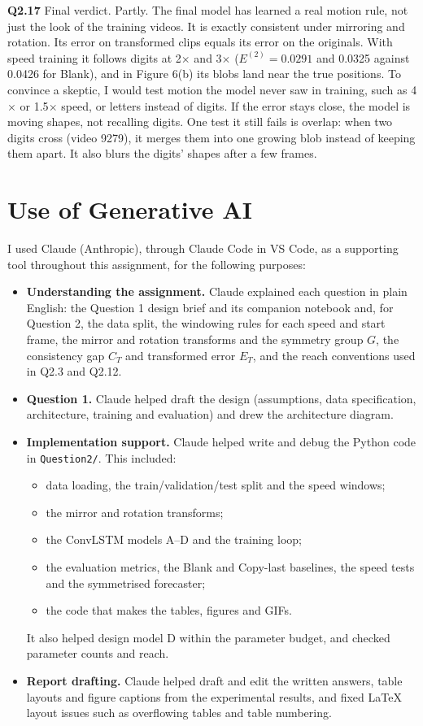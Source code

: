 \documentclass[11pt,a4paper]{article}
\begin{document}
\textbf{Q2.17} Final verdict. Partly. The final model has learned a real motion rule, not just the look of the training videos. It is exactly consistent under mirroring and rotation. Its error on transformed clips equals its error on the originals. With speed training it follows digits at 2$\times$ and 3$\times$ ($E^{(2)} = 0.0291$ and 0.0325 against 0.0426 for Blank), and in Figure 6(b) its blobs land near the true positions. To convince a skeptic, I would test motion the model never saw in training, such as 4$\times$ or 1.5$\times$ speed, or letters instead of digits. If the error stays close, the model is moving shapes, not recalling digits. One test it still fails is overlap: when two digits cross (video 9279), it merges them into one growing blob instead of keeping them apart. It also blurs the digits' shapes after a few frames.


\section*{Use of Generative AI}

I used Claude (Anthropic), through Claude Code in VS Code, as a supporting tool throughout this assignment, for the following purposes:

\begin{itemize}
  \item \textbf{Understanding the assignment.} Claude explained each question in plain English: the Question 1 design brief and its companion notebook and, for Question 2, the data split, the windowing rules for each speed and start frame, the mirror and rotation transforms and the symmetry group $G$, the consistency gap $C_T$ and transformed error $E_T$, and the reach conventions used in Q2.3 and Q2.12.
  \item \textbf{Question 1.} Claude helped draft the design (assumptions, data specification, architecture, training and evaluation) and drew the architecture diagram.
  \item \textbf{Implementation support.} Claude helped write and debug the Python code in \texttt{Question2/}. This included:
  \begin{itemize}
    \item data loading, the train/validation/test split and the speed windows;
    \item the mirror and rotation transforms;
    \item the ConvLSTM models A--D and the training loop;
    \item the evaluation metrics, the Blank and Copy-last baselines, the speed tests and the symmetrised forecaster;
    \item the code that makes the tables, figures and GIFs.
  \end{itemize}
  It also helped design model D within the parameter budget, and checked parameter counts and reach.
  \item \textbf{Report drafting.} Claude helped draft and edit the written answers, table layouts and figure captions from the experimental results, and fixed LaTeX layout issues such as overflowing tables and table numbering.
\end{itemize}
\end{document}

